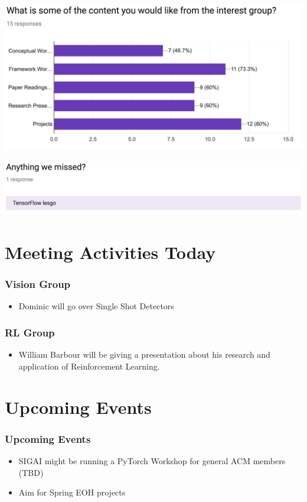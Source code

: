 \documentclass{beamer}
\begin{document}
\begin{frame}
  \begin{center}
    \includegraphics[width=0.8\linewidth]{feedback5.png}
  \end{center}
\end{frame}
\begin{frame}
  \begin{center}
    \includegraphics[width=0.8\linewidth]{feedback6.png}
  \end{center}
\end{frame}

\section{Meeting Activities Today}
\begin{frame}
  \frametitle{Vision Group}
  \begin{itemize}
  \item Dominic will go over Single Shot Detectors
  \end{itemize}
\end{frame}

\begin{frame}
  \frametitle{RL Group}
  \begin{itemize}
  \item William Barbour will be giving a presentation about his research and application of Reinforcement Learning.
  \end{itemize}
\end{frame}

\section{Upcoming Events}
\begin{frame}
  \frametitle{Upcoming Events}
  \begin{itemize}
  \item SIGAI might be running a PyTorch Workshop for general ACM members (TBD)
  \item Aim for Spring EOH projects
  \end{itemize}
\end{frame}
\end{document}
